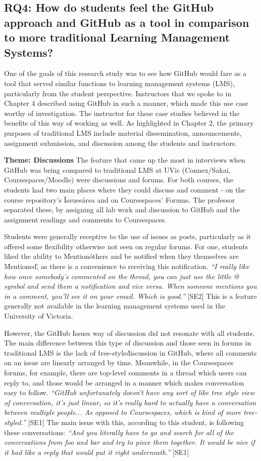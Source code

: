 \subsection{RQ4: How do students feel the GitHub approach and GitHub as a tool in comparison to more traditional Learning Management Systems?}
One of the goals of this research study was to see how GitHub would fare as a tool that served similar functions to learning management systems (LMS), particularly from the student perspective. Instructors that we spoke to in Chapter 4 described using GitHub in such a manner, which made this use case worthy of investigation. The instructor for these case studies believed in the benefits of this way of working as well. As highlighted in Chapter 2, the primary purposes of traditional LMS include material dissemination, announcements, assignment submission, and discussion among the students and instructors.

\textbf{Theme: Discussions} \break
The feature that came up the most in interviews when GitHub was being compared to traditional LMS at UVic (Connex/Sakai, Coursespaces/Moodle) were discussions and forums. For both courses, the students had two main places where they could discuss and comment - on the course repository's \'Issues\' area and on Coursespaces' Forums. The professor separated these, by assigning all lab work and discussion to GitHub and the assignment readings and comments to Coursespaces.

Students were generally receptive to the use of issues as posts, particularly as it offered some flexibility otherwise not seen on regular forums. For one, students liked the ability to \'Mention\' others and be notified when they themselves are \'Mentioned\', as there is a convenience to receiving this notification. \textit{``I really like how once somebody's commented on the thread, you can just use the little @ symbol and send them a notification and vice versa. When someone mentions you in a comment, you'll see it on your email. Which is good.''} [SE2] This is a feature generally not available in the learning management systems used in the University of Victoria.

However, the GitHub Issues way of discussion did not resonate with all students. The main difference between this type of discussion and those seen in forums in traditional LMS is the lack of \'tree-style\' discussion in GitHub, where all comments on an issue are linearly arranged by time. Meanwhile, in the Coursespaces forums, for example, there are top-level comments in a thread which users can reply to, and those would be arranged in a manner which makes conversation easy to follow. \textit{``GitHub unfortunately doesn't have any sort of like tree style view of conversation, it's just linear, so it's really hard to actually have a conversation between multiple people... As opposed to Coursespaces, which is kind of more tree-styled.''} [SE1] The main issue with this, according to this student, is following these conversations: \textit{``And you literally have to go and search for all of the conversations from foo and bar and try to piece them together. It would be nice if it had like a reply that would put it right underneath.''} [SE1]

